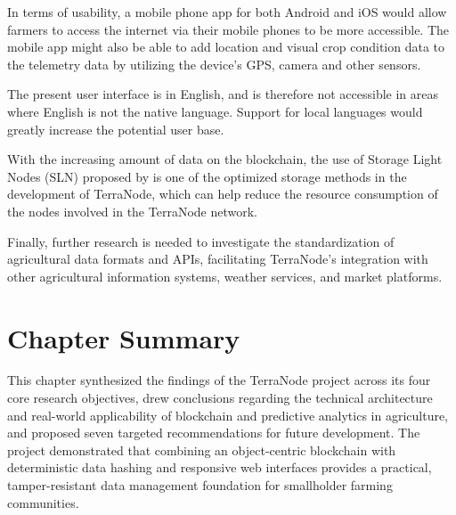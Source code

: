 In terms of usability, a mobile phone app for both Android and iOS would allow farmers to access the internet via their mobile phones to be more accessible. The mobile app might also be able to add location and visual crop condition data to the telemetry data by utilizing the device's GPS, camera and other sensors.

The present user interface is in English, and is therefore not accessible in areas where English is not the native language. Support for local languages would greatly increase the potential user base.

With the increasing amount of data on the blockchain, the use of Storage Light Nodes (SLN) proposed by \textcite{sun2025storage} is one of the optimized storage methods in the development of TerraNode, which can help reduce the resource consumption of the nodes involved in the TerraNode network.

Finally, further research is needed to investigate the standardization of agricultural data formats and APIs, facilitating TerraNode's integration with other agricultural information systems, weather services, and market platforms.

\section{Chapter Summary}

This chapter synthesized the findings of the TerraNode project across its four core research objectives, drew conclusions regarding the technical architecture and real-world applicability of blockchain and predictive analytics in agriculture, and proposed seven targeted recommendations for future development. The project demonstrated that combining an object-centric blockchain with deterministic data hashing and responsive web interfaces provides a practical, tamper-resistant data management foundation for smallholder farming communities.